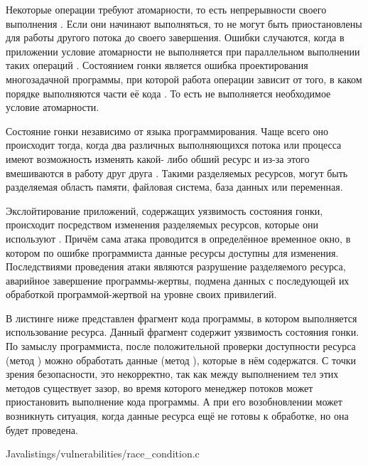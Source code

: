 %
Некоторые операции требуют атомарности, то есть непрерывности своего выполнения . 
%
Если они начинают выполняться, то не могут быть приостановлены для работы другого потока до своего завершения. 
%
Ошибки случаются, когда в приложении условие атомарности не выполняется при параллельном выполнении таких операций . 
%
Состоянием гонки является ошибка проектирования многозадачной программы, при которой работа операции зависит от того, в каком порядке выполняются части её кода . 
%
То есть не выполняется необходимое условие атомарности.

%
Состояние гонки независимо от языка программирования. 
%
Чаще всего оно происходит тогда, когда два различных выполняющихся потока или процесса имеют возможность изменять какой- либо обший ресурс и из-за этого вмешиваются в работу друг друга  . 
%
Такими разделяемых ресурсов, могут  быть разделяемая область памяти, файловая система, база данных или переменная. 

%
Экслойтирование приложений, содержащих уязвимость состояния гонки, происходит посредством изменения разделяемых ресурсов, которые они используют . 
%
Причём сама атака проводится в определённое временное окно, в котором по ошибке программиста данные ресурсы доступны для изменения. 
%
Последствиями проведения атаки являются разрушение разделяемого ресурса, аварийное завершение программы-жертвы, подмена данных с последующей их обработкой программой-жертвой на уровне своих привилегий. 

%
В листинге ниже представлен фрагмент кода программы, в котором выполняется использование ресурса. 
%
Данный фрагмент содержит уязвимость состояния гонки. 
%
По замыслу программиста, после положительной проверки доступности ресурса (метод ) можно обработать данные (метод ), которые в нём содержатся. 
% 
С точки зрения безопасности, это некорректно, так как между выполнением тел этих методов существует зазор, во время которого менеджер потоков может приостановить выполнение кода программы. 
%
А при его возобновлении может возникнуть ситуация, когда данные ресурса ещё не готовы к обработке, но она будет проведена. 

	{Java}{listings/vulnerabilities/race_condition.c}

